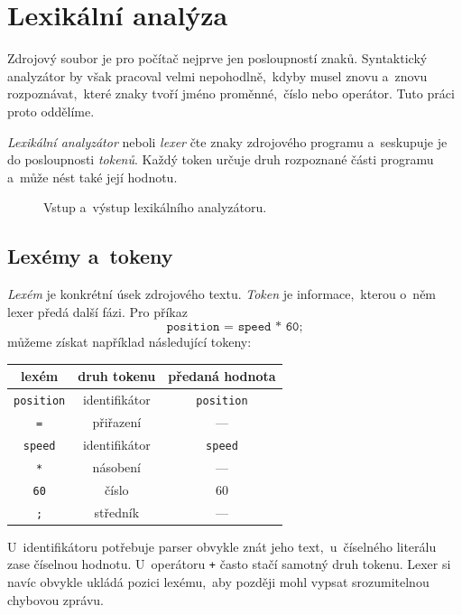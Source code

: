 \section{Lexikální analýza}\label{sec:lexikalni-analyza}

Zdrojový soubor je pro počítač nejprve jen posloupností znaků. Syntaktický analyzátor by však pracoval velmi nepohodlně,~kdyby musel znovu a~znovu rozpoznávat,~které znaky tvoří jméno proměnné,~číslo nebo operátor. Tuto práci proto oddělíme.

\emph{Lexikální analyzátor} neboli \emph{lexer} čte znaky zdrojového programu a~seskupuje je do posloupnosti \emph{tokenů}. Každý token určuje druh rozpoznané části programu a~může nést také její hodnotu.

\begin{figure}[h]
    \centering
    
    \caption{Vstup a~výstup lexikálního analyzátoru.}
    \label{fig:lexer-vstup-vystup}
\end{figure}

\subsection{Lexémy a~tokeny}

\emph{Lexém} je konkrétní úsek zdrojového textu. \emph{Token} je informace,~kterou o~něm lexer předá další fázi. Pro příkaz
\[
    \texttt{position = speed * 60;}
\]
můžeme získat například následující tokeny:

\begin{center}
\renewcommand{\arraystretch}{1.2}
\begin{tabular}{|c|c|c|}
    \hline
    \textbf{lexém} & \textbf{druh tokenu} & \textbf{předaná hodnota}\\
    \hline
    \texttt{position} & identifikátor & \texttt{position}\\
    \texttt{=} & přiřazení & ---\\
    \texttt{speed} & identifikátor & \texttt{speed}\\
    \texttt{*} & násobení & ---\\
    \texttt{60} & číslo & $60$\\
    \texttt{;} & středník & ---\\
    \hline
\end{tabular}
\end{center}

U~identifikátoru potřebuje parser obvykle znát jeho text,~u~číselného literálu zase číselnou hodnotu. U~operátoru \texttt{+} často stačí samotný druh tokenu. Lexer si navíc obvykle ukládá pozici lexému,~aby později mohl vypsat srozumitelnou chybovou zprávu.

